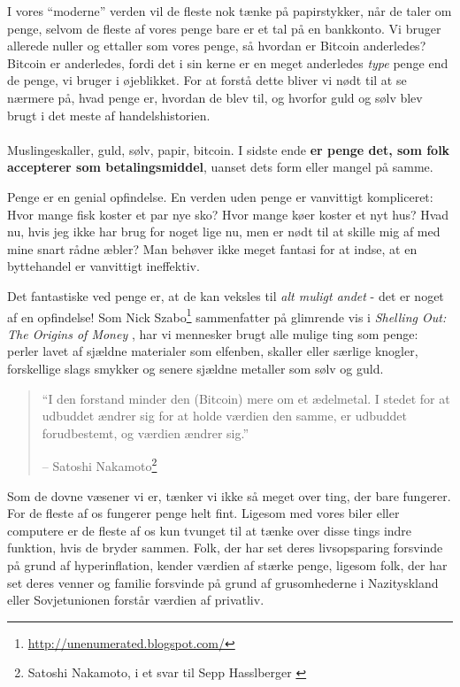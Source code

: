 \documentclass[paper=6in:9in,pagesize=pdftex,
               headinclude=on,footinclude=on,12pt]{scrbook}
\begin{document}
I vores \enquote{moderne} verden vil de fleste nok tænke på papirstykker, når de taler om penge, selvom de fleste af vores penge bare er et tal på en bankkonto. Vi bruger allerede nuller og ettaller som vores penge, så hvordan er Bitcoin anderledes? Bitcoin er anderledes, fordi det i sin kerne er en meget anderledes \textit{type} penge end de penge, vi bruger i øjeblikket. For at forstå dette bliver vi nødt til at se nærmere på, hvad penge er, hvordan de blev til, og hvorfor guld og sølv blev brugt i det meste af handelshistorien.\paragraph{} Muslingeskaller, guld, sølv, papir, bitcoin. I sidste ende \textbf{er penge det, som folk accepterer som betalingsmiddel}, uanset dets form eller mangel på samme.

Penge er en genial opfindelse. En verden uden penge er vanvittigt kompliceret: Hvor mange fisk koster et par nye sko? Hvor mange køer koster et nyt hus? Hvad nu, hvis jeg ikke har brug for noget lige nu, men er nødt til at skille mig af med mine snart rådne æbler? Man behøver ikke meget fantasi for at indse, at en byttehandel er vanvittigt ineffektiv.

Det fantastiske ved penge er, at de kan veksles til \textit{alt muligt andet} - det er noget af en opfindelse! Som Nick Szabo\footnote{\url{http://unenumerated.blogspot.com/}} sammenfatter på glimrende vis i \textit{Shelling Out: The Origins of Money} \cite{shelling-out}, har vi mennesker brugt alle mulige ting som penge: perler lavet af sjældne materialer som elfenben, skaller eller særlige knogler, forskellige slags smykker og senere sjældne metaller som sølv og guld.\begin{quotation}\begin{samepage} \enquote{I den forstand minder den (Bitcoin) mere om et ædelmetal. I stedet for at udbuddet ændrer sig for at holde værdien den samme, er udbuddet forudbestemt, og værdien ændrer sig.} \begin{flushright} -- Satoshi Nakamoto\footnote{Satoshi Nakamoto, i et svar til Sepp Hasslberger \cite{satoshi-precious-metal}}
\end{flushright}\end{samepage}\end{quotation}

Som de dovne væsener vi er, tænker vi ikke så meget over ting, der bare fungerer. For de fleste af os fungerer penge helt fint. Ligesom med vores biler eller computere er de fleste af os kun tvunget til at tænke over disse tings indre funktion, hvis de bryder sammen. Folk, der har set deres livsopsparing forsvinde på grund af hyperinflation, kender værdien af stærke penge, ligesom folk, der har set deres venner og familie forsvinde på grund af grusomhederne i Nazityskland eller Sovjetunionen forstår værdien af privatliv.
\end{document}
